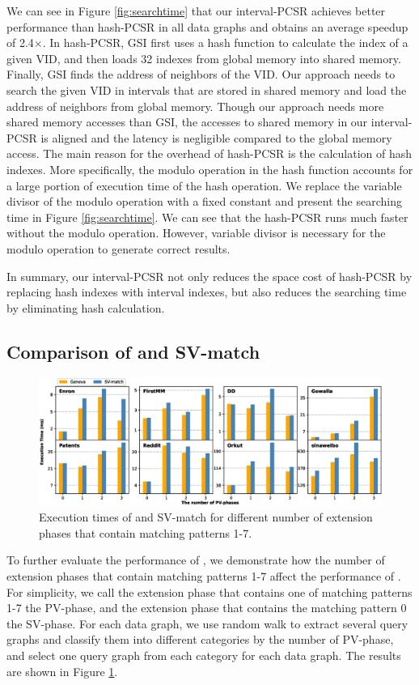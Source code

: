 We can see in Figure \ref{fig:searchtime} that our interval-PCSR achieves better performance than hash-PCSR in all data graphs and obtains
an average speedup of 2.4$\times$. In hash-PCSR, GSI first uses a hash function to calculate the index of a given VID, and then loads 32
indexes from global memory into shared memory. Finally, GSI finds the address of neighbors of the VID. Our approach needs to search the
given VID in intervals that are stored in shared memory and load the address of neighbors from global memory. Though our approach needs
more shared memory accesses than GSI, the accesses to shared memory in our interval-PCSR is aligned and the latency is negligible compared
to the global memory access. The main reason for the overhead of hash-PCSR is the calculation of hash indexes. More specifically, the
modulo operation in the hash function accounts for a large portion of execution time of the hash operation. We replace the variable divisor
of the modulo operation with a fixed constant and present the searching time in Figure \ref{fig:searchtime}. We can see that the hash-PCSR
runs much faster without the modulo operation. However, variable divisor is necessary for the modulo operation to generate correct results.

In summary, our interval-PCSR not only reduces the space cost of hash-PCSR by replacing hash indexes with interval indexes, but also
reduces the searching time by eliminating hash calculation.


\subsection{Comparison of \SystemName and SV-match\label{sec:comparesv}} 
\begin{figure}
\centering
\includegraphics[width=\textwidth]{./figure/compareSV.eps}
\caption{Execution times of \SystemName and SV-match for different number of extension phases that contain matching patterns 1-7.}	
\label{fig:compareSV}
\end{figure}
To further evaluate the performance of \SystemName, we demonstrate how the number of extension phases that contain matching patterns 1-7 affect the performance of \SystemName. For simplicity, we call the extension phase that contains one of matching patterns 1-7 the PV-phase, and the extension phase that contains the matching pattern 0 the SV-phase. For each data graph, we use random walk to extract several query graphs and classify them into different categories by the number of PV-phase, and select one query graph from each category for each data graph. The results are shown in Figure \ref{fig:compareSV}.

